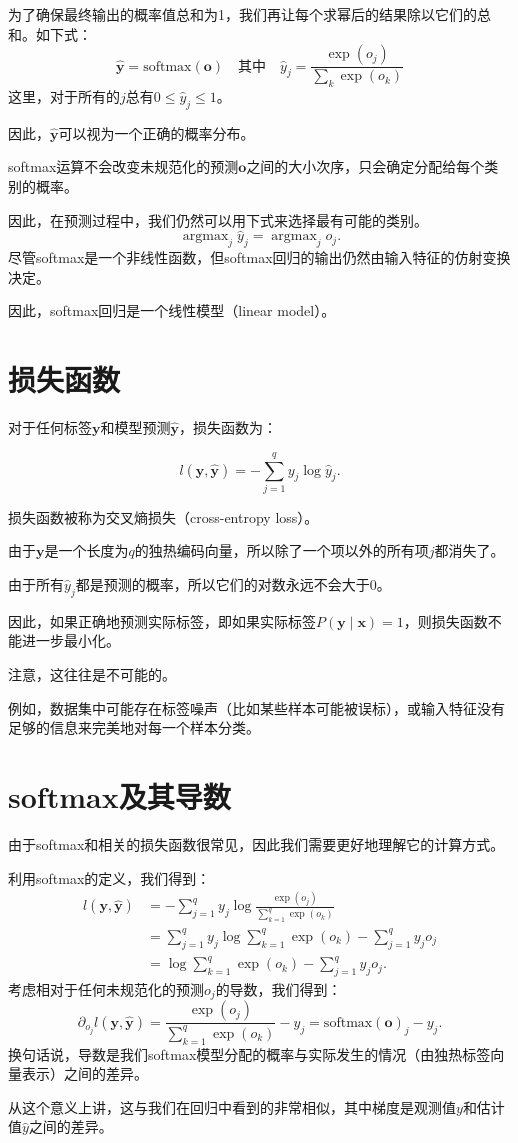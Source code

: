 \documentclass[openany,11pt]{book}
\begin{document}
为了确保最终输出的概率值总和为1，我们再让每个求幂后的结果除以它们的总和。如下式：
$$\hat{\mathbf{y}} = \mathrm{softmax}(\mathbf{o})\quad \text{其中}\quad \hat{y}_j = \frac{\exp(o_j)}{\sum_k \exp(o_k)}$$
这里，对于所有的$j$总有$0 \leq \hat{y}_j \leq 1$。

因此，$\hat{\mathbf{y}}$可以视为一个正确的概率分布。

softmax运算不会改变未规范化的预测$\mathbf{o}$之间的大小次序，只会确定分配给每个类别的概率。

因此，在预测过程中，我们仍然可以用下式来选择最有可能的类别。
$$
\operatorname{argmax}_j \hat y_j = \operatorname{argmax}_j o_j.
$$
尽管softmax是一个非线性函数，但softmax回归的输出仍然由输入特征的仿射变换决定。

因此，softmax回归是一个线性模型（linear model）。


\section{损失函数}

对于任何标签$\mathbf{y}$和模型预测$\hat{\mathbf{y}}$，损失函数为：

$$ l(\mathbf{y}, \hat{\mathbf{y}}) = - \sum_{j=1}^q y_j \log \hat{y}_j. $$

损失函数被称为交叉熵损失（cross-entropy loss）。

由于$\mathbf{y}$是一个长度为$q$的独热编码向量，所以除了一个项以外的所有项$j$都消失了。

由于所有$\hat{y}_j$都是预测的概率，所以它们的对数永远不会大于$0$。

因此，如果正确地预测实际标签，即如果实际标签$P(\mathbf{y} \mid \mathbf{x})=1$，则损失函数不能进一步最小化。

注意，这往往是不可能的。

例如，数据集中可能存在标签噪声（比如某些样本可能被误标），或输入特征没有足够的信息来完美地对每一个样本分类。


\section{softmax及其导数}
由于softmax和相关的损失函数很常见，因此我们需要更好地理解它的计算方式。

利用softmax的定义，我们得到：
$$
\begin{aligned}
	l(\mathbf{y}, \hat{\mathbf{y}}) &=  - \sum_{j=1}^q y_j \log \frac{\exp(o_j)}{\sum_{k=1}^q \exp(o_k)} \\
	&= \sum_{j=1}^q y_j \log \sum_{k=1}^q \exp(o_k) - \sum_{j=1}^q y_j o_j\\
	&= \log \sum_{k=1}^q \exp(o_k) - \sum_{j=1}^q y_j o_j.
\end{aligned}
$$
考虑相对于任何未规范化的预测$o_j$的导数，我们得到：
$$
\partial_{o_j} l(\mathbf{y}, \hat{\mathbf{y}}) = \frac{\exp(o_j)}{\sum_{k=1}^q \exp(o_k)} - y_j = \mathrm{softmax}(\mathbf{o})_j - y_j.
$$
换句话说，导数是我们softmax模型分配的概率与实际发生的情况（由独热标签向量表示）之间的差异。

从这个意义上讲，这与我们在回归中看到的非常相似，其中梯度是观测值$y$和估计值$\hat{y}$之间的差异。
\end{document}
